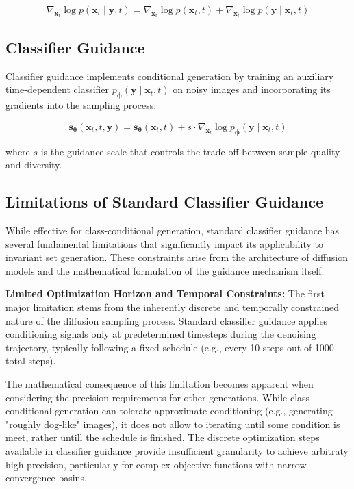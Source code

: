 \documentclass[licencjacka,en]{pracamgr}
\begin{document}
\begin{equation}
\nabla_{\mathbf{x}_t} \log p(\mathbf{x}_t \mid \mathbf{y}, t) = \nabla_{\mathbf{x}_t} \log p(\mathbf{x}_t, t) + \nabla_{\mathbf{x}_t} \log p(\mathbf{y} \mid \mathbf{x}_t, t)
\label{eq:conditional_score}
\end{equation}

\subsection{Classifier Guidance}

Classifier guidance \citep{dhariwal2021diffusionmodelsbeatgans} implements conditional generation by training an auxiliary time-dependent classifier $p_{\boldsymbol{\phi}}(\mathbf{y} \mid \mathbf{x}_t, t)$ on noisy images and incorporating its gradients into the sampling process:

\begin{equation}
\tilde{\mathbf{s}}_{\boldsymbol{\theta}}(\mathbf{x}_t, t, \mathbf{y}) = \mathbf{s}_{\boldsymbol{\theta}}(\mathbf{x}_t, t) + s \cdot \nabla_{\mathbf{x}_t} \log p_{\boldsymbol{\phi}}(\mathbf{y} \mid \mathbf{x}_t, t)
\label{eq:classifier_guidance}
\end{equation}

where $s$ is the guidance scale that controls the trade-off between sample quality and diversity.

\subsection{Limitations of Standard Classifier Guidance}

While effective for class-conditional generation, standard classifier guidance has several fundamental limitations that significantly impact its applicability to invariant set generation. These constraints arise from the architecture of diffusion models and the mathematical formulation of the guidance mechanism itself.

\textbf{Limited Optimization Horizon and Temporal Constraints:} The first major limitation stems from the inherently discrete and temporally constrained nature of the diffusion sampling process. Standard classifier guidance applies conditioning signals only at predetermined timesteps during the denoising trajectory, typically following a fixed schedule (e.g., every 10 steps out of 1000 total steps).

The mathematical consequence of this limitation becomes apparent when considering the precision requirements for other generations. While class-conditional generation can tolerate approximate conditioning (e.g., generating "roughly dog-like" images), it does not allow to iterating until some condition is meet, rather untill the schedule is finished. The discrete optimization steps available in classifier guidance provide insufficient granularity to achieve arbitraty high precision, particularly for complex objective functions with narrow convergence basins.
\end{document}

